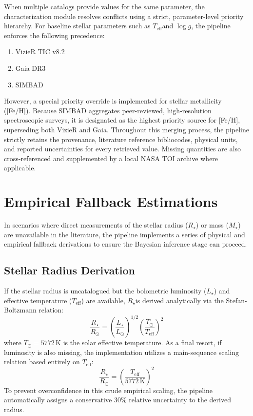 \documentclass[12pt,a4paper,oneside]{report}
\newcommand{\Rsun}{\ensuremath{R_{\odot}}}
\newcommand{\Rstar}{\ensuremath{R_{\star}}}
\newcommand{\Mstar}{\ensuremath{M_{\star}}}
\newcommand{\Teff}{\ensuremath{T_{\mathrm{eff}}}}
\begin{document}
When multiple catalogs provide values for the same parameter, the characterization module resolves conflicts using a strict, parameter-level priority hierarchy. For baseline stellar parameters such as \Teff and \(\log g\), the pipeline enforces the following precedence:
\begin{enumerate}
    \item VizieR TIC v8.2
    \item Gaia DR3
    \item SIMBAD
\end{enumerate}
However, a special priority override is implemented for stellar metallicity ([Fe/H]). Because SIMBAD aggregates peer-reviewed, high-resolution spectroscopic surveys, it is designated as the highest priority source for [Fe/H], superseding both VizieR and Gaia. Throughout this merging process, the pipeline strictly retains the provenance, literature reference bibliocodes, physical units, and reported uncertainties for every retrieved value. Missing quantities are also cross-referenced and supplemented by a local NASA TOI archive where applicable.

\section{Empirical Fallback Estimations}
In scenarios where direct measurements of the stellar radius (\Rstar) or mass (\Mstar) are unavailable in the literature, the pipeline implements a series of physical and empirical fallback derivations to ensure the Bayesian inference stage can proceed. 

\subsection{Stellar Radius Derivation}
If the stellar radius is uncatalogued but the bolometric luminosity (\(L_\star\)) and effective temperature (\Teff) are available, \Rstar is derived analytically via the Stefan-Boltzmann relation:
\begin{equation}
  \frac{\Rstar}{\Rsun} = \left(\frac{L_\star}{L_\odot}\right)^{1/2} \left(\frac{T_{\odot}}{\Teff}\right)^2
\end{equation}
where \(T_\odot = 5772\,\mathrm{K}\) is the solar effective temperature. As a final resort, if luminosity is also missing, the implementation utilizes a main-sequence scaling relation based entirely on \Teff:
\begin{equation}
  \frac{\Rstar}{\Rsun} = \left(\frac{\Teff}{5772\,\mathrm{K}}\right)^2
\end{equation}
To prevent overconfidence in this crude empirical scaling, the pipeline automatically assigns a conservative 30\% relative uncertainty to the derived radius.
\end{document}
